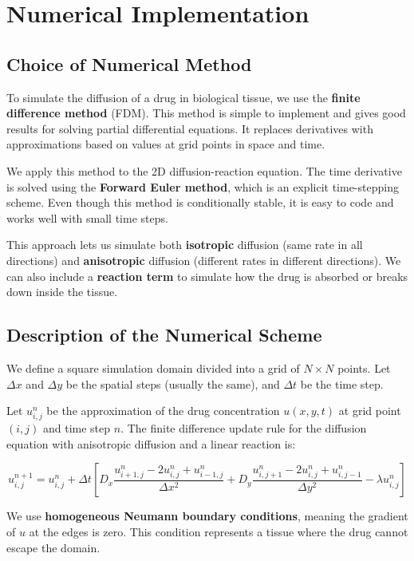 \documentclass[11pt, a4paper]{article}
\begin{document}
\section{Numerical Implementation}

\subsection{Choice of Numerical Method}
To simulate the diffusion of a drug in biological tissue, we use the \textbf{finite difference method} (FDM). This method is simple to implement and gives good results for solving partial differential equations. It replaces derivatives with approximations based on values at grid points in space and time.

We apply this method to the 2D diffusion-reaction equation. The time derivative is solved using the \textbf{Forward Euler method}, which is an explicit time-stepping scheme. Even though this method is conditionally stable, it is easy to code and works well with small time steps.

This approach lets us simulate both \textbf{isotropic} diffusion (same rate in all directions) and \textbf{anisotropic} diffusion (different rates in different directions). We can also include a \textbf{reaction term} to simulate how the drug is absorbed or breaks down inside the tissue.

\subsection{Description of the Numerical Scheme}
We define a square simulation domain divided into a grid of \( N \times N \) points. Let \( \Delta x \) and \( \Delta y \) be the spatial steps (usually the same), and \( \Delta t \) be the time step.

Let \( u_{i,j}^n \) be the approximation of the drug concentration \( u(x, y, t) \) at grid point \( (i,j) \) and time step \( n \). The finite difference update rule for the diffusion equation with anisotropic diffusion and a linear reaction is:

\[
u_{i,j}^{n+1} = u_{i,j}^n + \Delta t \left[ D_x \frac{u_{i+1,j}^n - 2u_{i,j}^n + u_{i-1,j}^n}{\Delta x^2} + D_y \frac{u_{i,j+1}^n - 2u_{i,j}^n + u_{i,j-1}^n}{\Delta y^2} - \lambda u_{i,j}^n \right]
\]

We use \textbf{homogeneous Neumann boundary conditions}, meaning the gradient of \( u \) at the edges is zero. This condition represents a tissue where the drug cannot escape the domain.
\end{document}
